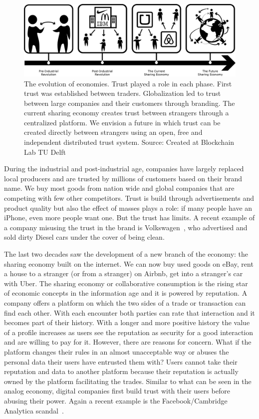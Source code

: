 \begin{figure}[h]
    \centering
    \includegraphics[width=\textwidth]{images/economy.png}
    \caption{The evolution of economies. Trust played a role in each phase. First trust was established between traders. Globalization led to trust between large companies and their customers through branding. The current sharing economy creates trust between strangers through a centralized platform. We envision a future in which trust 
    can be created directly between strangers using an open, free and independent distributed trust system. Source: Created at Blockchain Lab TU Delft}
    \label{fig:economy}
\end{figure}

During the industrial and post-industrial age, companies have largely replaced local producers and are 
trusted by millions of customers based on their brand name. We buy most goods from nation wide and 
global companies that are competing with few other competitors. Trust is build through advertisements
and product quality but also the effect of masses plays a role: if many people have an iPhone, even 
more people want one. But the trust has limits. A recent example of a company misusing the trust in 
the brand is Volkswagen~\cite{VWDiesel}, who advertised and sold dirty Diesel cars under the cover 
of being clean. 

The last two decades saw the development of a new branch of the economy: the sharing economy built on the internet. 
We can now buy used goods on eBay, rent a house to a stranger (or from a 
stranger) on Airbnb, get into a stranger's car with Uber. The sharing economy or collaborative consumption is the 
rising star of economic concepts in the information age and it is powered by reputation. A company 
offers a platform on which the two sides of a trade or transaction can find each other. With each 
encounter both parties can rate that interaction and it becomes part of their history. With a longer
and more positive history the value of a profile increases as users see the reputation as security
for a good interaction and are willing to pay for it. However, there are reasons for concern. What
if the platform changes their rules in an almost unacceptable way or abuses the personal data their
users have entrusted them with? Users cannot take their reputation and data to another platform
because their reputation is actually owned by the platform facilitating the trades. Similar to what
can be seen in the analog economy, digital companies first build trust with their users before 
abusing their power. Again a recent example is the Facebook/Cambridge Analytica scandal~\cite{facebook}.


